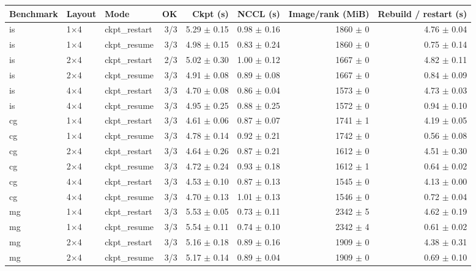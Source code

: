 \begin{tabular}{lllrrrrr}
\toprule
Benchmark & Layout & Mode & OK & Ckpt (s) & NCCL (s) & Image/rank (MiB) & Rebuild / restart (s) \\
\midrule
is & 1$\times$4 & ckpt\_restart & 3/3 & 5.29 $\pm$ 0.15 & 0.98 $\pm$ 0.16 & 1860 $\pm$ 0 & 4.76 $\pm$ 0.04 \\
is & 1$\times$4 & ckpt\_resume & 3/3 & 4.98 $\pm$ 0.15 & 0.83 $\pm$ 0.24 & 1860 $\pm$ 0 & 0.75 $\pm$ 0.14 \\
is & 2$\times$4 & ckpt\_restart & 2/3 & 5.02 $\pm$ 0.30 & 1.00 $\pm$ 0.12 & 1667 $\pm$ 0 & 4.82 $\pm$ 0.11 \\
is & 2$\times$4 & ckpt\_resume & 3/3 & 4.91 $\pm$ 0.08 & 0.89 $\pm$ 0.08 & 1667 $\pm$ 0 & 0.84 $\pm$ 0.09 \\
is & 4$\times$4 & ckpt\_restart & 3/3 & 4.70 $\pm$ 0.08 & 0.86 $\pm$ 0.04 & 1573 $\pm$ 0 & 4.73 $\pm$ 0.03 \\
is & 4$\times$4 & ckpt\_resume & 3/3 & 4.95 $\pm$ 0.25 & 0.88 $\pm$ 0.25 & 1572 $\pm$ 0 & 0.94 $\pm$ 0.10 \\
cg & 1$\times$4 & ckpt\_restart & 3/3 & 4.61 $\pm$ 0.06 & 0.87 $\pm$ 0.07 & 1741 $\pm$ 1 & 4.19 $\pm$ 0.05 \\
cg & 1$\times$4 & ckpt\_resume & 3/3 & 4.78 $\pm$ 0.14 & 0.92 $\pm$ 0.21 & 1742 $\pm$ 0 & 0.56 $\pm$ 0.08 \\
cg & 2$\times$4 & ckpt\_restart & 3/3 & 4.64 $\pm$ 0.26 & 0.87 $\pm$ 0.21 & 1612 $\pm$ 0 & 4.51 $\pm$ 0.30 \\
cg & 2$\times$4 & ckpt\_resume & 3/3 & 4.72 $\pm$ 0.24 & 0.93 $\pm$ 0.18 & 1612 $\pm$ 1 & 0.64 $\pm$ 0.02 \\
cg & 4$\times$4 & ckpt\_restart & 3/3 & 4.53 $\pm$ 0.10 & 0.87 $\pm$ 0.13 & 1545 $\pm$ 0 & 4.13 $\pm$ 0.00 \\
cg & 4$\times$4 & ckpt\_resume & 3/3 & 4.70 $\pm$ 0.13 & 1.01 $\pm$ 0.13 & 1546 $\pm$ 0 & 0.72 $\pm$ 0.04 \\
mg & 1$\times$4 & ckpt\_restart & 3/3 & 5.53 $\pm$ 0.05 & 0.73 $\pm$ 0.11 & 2342 $\pm$ 5 & 4.62 $\pm$ 0.19 \\
mg & 1$\times$4 & ckpt\_resume & 3/3 & 5.54 $\pm$ 0.11 & 0.74 $\pm$ 0.10 & 2342 $\pm$ 4 & 0.61 $\pm$ 0.02 \\
mg & 2$\times$4 & ckpt\_restart & 3/3 & 5.16 $\pm$ 0.18 & 0.89 $\pm$ 0.16 & 1909 $\pm$ 0 & 4.38 $\pm$ 0.31 \\
mg & 2$\times$4 & ckpt\_resume & 3/3 & 5.17 $\pm$ 0.14 & 0.89 $\pm$ 0.04 & 1909 $\pm$ 0 & 0.69 $\pm$ 0.10 \\

\end{tabular}

